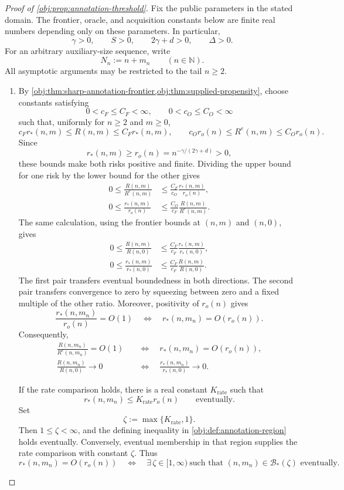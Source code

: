 \begin{proof}[Proof of \cref{obj:prop:annotation-threshold}]
Fix the public parameters in the stated domain. The frontier, oracle, and acquisition constants below are finite real numbers depending only on these parameters. In particular,
\[
\gamma>0,\qquad S>0,\qquad 2\gamma+d>0,\qquad \Delta>0.
\]
For an arbitrary auxiliary-size sequence, write
\[
N_n:=n+m_n\qquad(n\in\mathbb N).
\]
All asymptotic arguments may be restricted to the tail \(n\ge2\).

\begin{enumerate}
\item\label{proof:annotation-threshold-risk-rate}
By \cref{obj:thm:sharp-annotation-frontier,obj:thm:supplied-propensity}, choose constants satisfying
\[
0<c_F\le C_F<\infty,\qquad 0<c_O\le C_O<\infty
\]
such that, uniformly for \(n\ge2\) and \(m\ge0\),
\[
c_F r_*(n,m)\le R(n,m)\le C_F r_*(n,m),
\qquad
c_O r_o(n)\le R^e(n,m)\le C_O r_o(n).
\]
Since
\[
r_*(n,m)\ge r_o(n)=n^{-\gamma/(2\gamma+d)}>0,
\]
these bounds make both risks positive and finite. Dividing the upper bound for one risk by the lower bound for the other gives
\[
\begin{aligned}
0\le \frac{R(n,m)}{R^e(n,m)}
&\le \frac{C_F}{c_O}\frac{r_*(n,m)}{r_o(n)},\\
0\le \frac{r_*(n,m)}{r_o(n)}
&\le \frac{C_O}{c_F}\frac{R(n,m)}{R^e(n,m)}.
\end{aligned}
\]
The same calculation, using the frontier bounds at \((n,m)\) and \((n,0)\), gives
\[
\begin{aligned}
0\le \frac{R(n,m)}{R(n,0)}
&\le \frac{C_F}{c_F}\frac{r_*(n,m)}{r_*(n,0)},\\
0\le \frac{r_*(n,m)}{r_*(n,0)}
&\le \frac{C_F}{c_F}\frac{R(n,m)}{R(n,0)}.
\end{aligned}
\]
The first pair transfers eventual boundedness in both directions. The second pair transfers convergence to zero by squeezing between zero and a fixed multiple of the other ratio. Moreover, positivity of \(r_o(n)\) gives
\[
\frac{r_*(n,m_n)}{r_o(n)}=O(1)
\quad\Longleftrightarrow\quad
r_*(n,m_n)=O(r_o(n)).
\]
Consequently,
\[
\begin{aligned}
\frac{R(n,m_n)}{R^e(n,m_n)}=O(1)
&\quad\Longleftrightarrow\quad r_*(n,m_n)=O(r_o(n)),\\
\frac{R(n,m_n)}{R(n,0)}\longrightarrow0
&\quad\Longleftrightarrow\quad
\frac{r_*(n,m_n)}{r_*(n,0)}\longrightarrow0.
\end{aligned}
\]

If the rate comparison holds, there is a real constant \(K_{\mathrm{rate}}\) such that
\[
r_*(n,m_n)\le K_{\mathrm{rate}}r_o(n)
\qquad\text{eventually}.
\]
Set
\[
\zeta:=\max\{K_{\mathrm{rate}},1\}.
\]
Then \(1\le\zeta<\infty\), and the defining inequality in
\cref{obj:def:annotation-region} holds eventually. Conversely, eventual membership in that region supplies the rate comparison with constant \(\zeta\). Thus
\[
r_*(n,m_n)=O(r_o(n))
\quad\Longleftrightarrow\quad
\exists\,\zeta\in[1,\infty)\ 
\text{such that }(n,m_n)\in\mathcal B_*(\zeta)
\text{ eventually}.
\]


\end{enumerate}
\end{proof}
